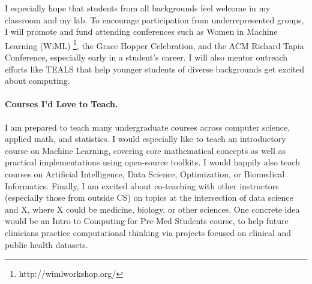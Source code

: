 \documentclass[11pt,letterpaper]{article}
\begin{document}
I especially hope that students from all backgrounds feel welcome in my classroom and my lab. To encourage participation from underrepresented groups, I will promote and fund attending conferences such as Women in Machine Learning (WiML) \footnote{http://wimlworkshop.org/}, the Grace Hopper Celebration, and the ACM Richard Tapia Conference, especially early in a student's career. I will also mentor outreach efforts like TEALS that help younger students of diverse backgrounds get excited about computing.




\paragraph{Courses I'd Love to Teach.}
I am prepared to teach many undergraduate courses across computer science, applied math, and statistics. I would especially like to teach an introductory course on Machine Learning, covering core mathematical concepts as well as practical implementations using open-source toolkits. I would happily also teach courses on Artificial Intelligence, Data Science, Optimization, or Biomedical Informatics. 
Finally, I am excited about co-teaching with other instructors (especially those from outside CS) on topics at the intersection of data science and X, where X could be medicine, biology, or other sciences. One concrete idea would be an Intro to Computing for Pre-Med Students course, to help future clinicians practice computational thinking via projects focused on clinical and public health datasets.
\end{document}
